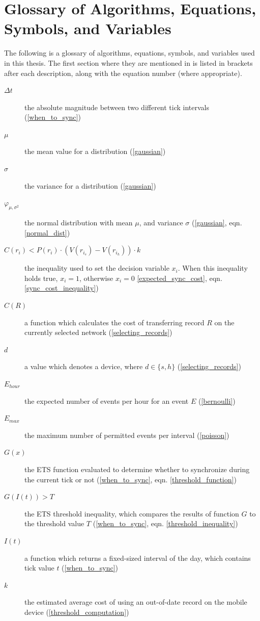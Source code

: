 \chapter{Glossary of Algorithms, Equations, Symbols, and Variables}

The following is a glossary of algorithms, equations, symbols, and variables used in this thesis.  The first section where they are mentioned in is listed in brackets after each description, along with the equation number (where appropriate).

\begin{description}
\item[$\Delta t$] the absolute magnitude between two different tick intervals (\ref{when_to_sync})
\item[$\mu$] the mean value for a distribution (\ref{gaussian})
\item[$\sigma$] the variance for a distribution (\ref{gaussian})
\item[$\varphi_{\mu,\sigma^2}$] the normal distribution with mean $\mu$, and variance $\sigma$ (\ref{gaussian}, eqn. \ref{normal_dist})
\item[$C(r_i) < P(r_i)\cdot(V(r_{i_s})-V(r_{i_h}))\cdot k $] the inequality used to set the decision variable $x_i$.  When this inequality holds true, $x_i = 1$, otherwise $x_i = 0$ \ref{expected_sync_cost}, eqn. \ref{sync_cost_inequality})
\item[$C(R)$] a function which calculates the cost of transferring record $R$ on the currently selected network (\ref{selecting_records})
\item[$d$] a value which denotes a device, where $d \in \{s, h\}$ (\ref{selecting_records})
\item[$E_{hour}$] the expected number of events per hour for an event $E$ (\ref{bernoulli})
\item[$E_{max}$] the maximum number of permitted events per interval (\ref{poisson})
\item[$G(x)$] the ETS function evaluated to determine whether to synchronize during the current tick or not (\ref{when_to_sync}, eqn. \ref{threshold_function})
\item[$G(I(t)) > T$] the ETS threshold inequality, which compares the results of function $G$ to the threshold value $T$ (\ref{when_to_sync}, eqn. \ref{threshold_inequality})
\item[$I(t)$] a function which returns a fixed-sized interval of the day, which contains tick value $t$ (\ref{when_to_sync})
\item[$k$] the estimated average cost of using an out-of-date record on the mobile device (\ref{threshold_computation})

\end{description}
